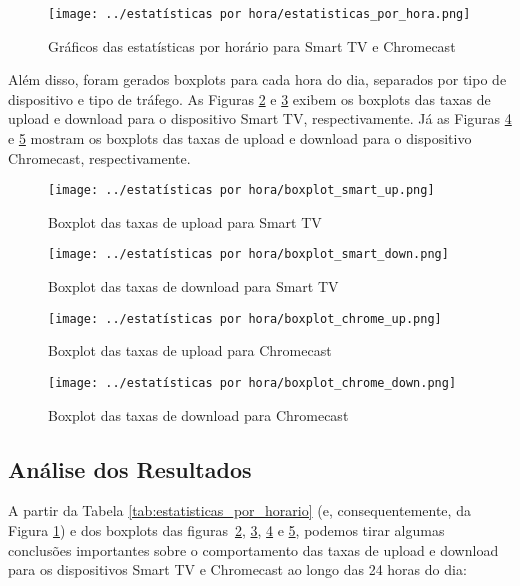 \begin{figure}[H]
    \centering
    \texttt{[image: ../estatísticas por hora/estatisticas\_por\_hora.png]}
    \caption{Gráficos das estatísticas por horário para Smart TV e Chromecast}
    \label{fig:estatisticas_por_hora}
\end{figure}

Além disso, foram gerados boxplots para cada hora do dia, separados por tipo de dispositivo e tipo de tráfego. As Figuras \ref{fig:boxplot_smart_up} e \ref{fig:boxplot_smart_down} exibem os boxplots das taxas de upload e download para o dispositivo Smart TV, respectivamente. Já as Figuras \ref{fig:boxplot_chrome_up} e \ref{fig:boxplot_chrome_down} mostram os boxplots das taxas de upload e download para o dispositivo Chromecast, respectivamente.

\begin{figure}[H]
    \centering
    \texttt{[image: ../estatísticas por hora/boxplot\_smart\_up.png]}
    \caption{Boxplot das taxas de upload para Smart TV}
    \label{fig:boxplot_smart_up}
\end{figure}

\begin{figure}[H]
    \centering
    \texttt{[image: ../estatísticas por hora/boxplot\_smart\_down.png]}
    \caption{Boxplot das taxas de download para Smart TV}
    \label{fig:boxplot_smart_down}
\end{figure}

\begin{figure}[H]
    \centering
    \texttt{[image: ../estatísticas por hora/boxplot\_chrome\_up.png]}
    \caption{Boxplot das taxas de upload para Chromecast}
    \label{fig:boxplot_chrome_up}
\end{figure}

\begin{figure}[H]
    \centering
    \texttt{[image: ../estatísticas por hora/boxplot\_chrome\_down.png]}
    \caption{Boxplot das taxas de download para Chromecast}
    \label{fig:boxplot_chrome_down}
\end{figure}

\subsection{Análise dos Resultados}
\label{sec:analise_resultados_horario}

A partir da Tabela \ref{tab:estatisticas_por_horario} (e, consequentemente, da Figura  \ref{fig:estatisticas_por_hora}) e dos boxplots das figuras~\ref{fig:boxplot_smart_up}, \ref{fig:boxplot_smart_down}, \ref{fig:boxplot_chrome_up} e \ref{fig:boxplot_chrome_down}, podemos tirar algumas conclusões importantes sobre o comportamento das taxas de upload e download para os dispositivos Smart TV e Chromecast ao longo das 24 horas do dia:

